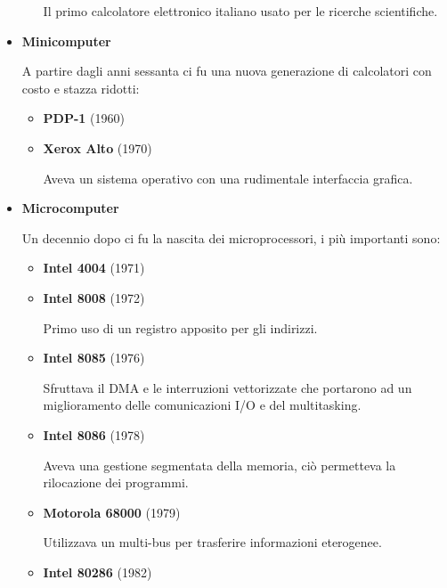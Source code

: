 \documentclass{article}
\begin{document}
\begin{itemize}
\begin{itemize}
                Il primo calcolatore elettronico italiano usato per le ricerche scientifiche.\newline
            
        \end{itemize}

        \item \textbf{Minicomputer}

            A partire dagli anni sessanta ci fu una nuova generazione di calcolatori con costo e stazza ridotti:
            \begin{itemize}
                \item \textbf{PDP-1} (1960)
                \item \textbf{Xerox Alto} (1970)

                    Aveva un sistema operativo con una rudimentale interfaccia grafica.\newline
                    
            \end{itemize}

        \item \textbf{Microcomputer}

            Un decennio dopo ci fu la nascita dei microprocessori, i più importanti sono:
            \begin{itemize}
                \item \textbf{Intel 4004} (1971)
                \item \textbf{Intel 8008} (1972)

                    Primo uso di un registro apposito per gli indirizzi.

                \item \textbf{Intel 8085} (1976)

                    Sfruttava il DMA e le interruzioni vettorizzate che portarono ad un miglioramento delle comunicazioni I/O e del multitasking.

                \item \textbf{Intel 8086} (1978)

                    Aveva una gestione segmentata della memoria, ciò permetteva la rilocazione dei programmi.

                \item \textbf{Motorola 68000} (1979)

                    Utilizzava un multi-bus per trasferire informazioni eterogenee.

                \item \textbf{Intel 80286} (1982)


\end{itemize}
\end{itemize}
\end{document}
